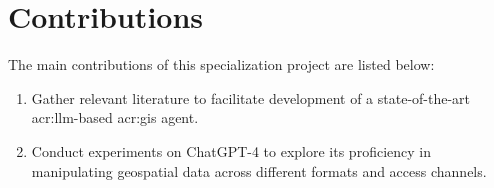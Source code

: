 \section{Contributions}
\label{sec:introContributions}

The main contributions of this specialization project are listed below:
\begin{enumerate}
    \item Gather relevant literature to facilitate development of a state-of-the-art \acrshort{acr:llm}-based \acrshort{acr:gis} agent.
    \item Conduct experiments on ChatGPT-4 to explore its proficiency in manipulating geospatial data across different formats and access channels.
\end{enumerate}

